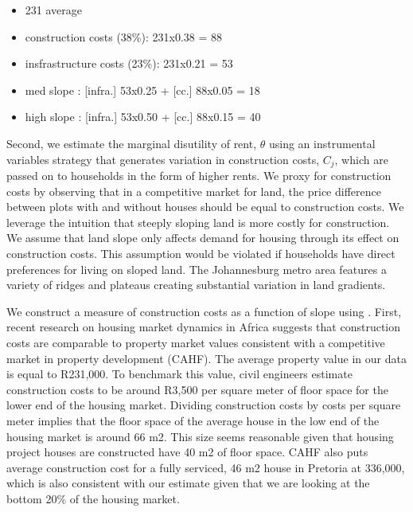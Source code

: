 \documentclass[12pt]{article}
\begin{document}


\begin{itemize}
	\item 231 average
	\item construction costs (38\%): 231x0.38 = 88
	\item insfrastructure costs (23\%): 231x0.21 = 53
	\item med slope  : [infra.] 53x0.25 + [cc.] 88x0.05 = 18
	\item high slope : [infra.] 53x0.50 + [cc.] 88x0.15 = 40


\end{itemize}


Second, we estimate the marginal disutility of rent, $\theta$ using an instrumental variables strategy that generates variation in construction costs, $C_j$, which are passed on to households in the form of higher rents.  We proxy for construction costs by observing that in a competitive market for land, the price difference between plots with and without houses should be equal to construction costs.  We leverage the intuition that steeply sloping land is more costly for construction.  We assume that land slope only affects demand for housing through its effect on construction costs.  This assumption would be violated if households have direct preferences for living on sloped land.   The Johannesburg metro area features a variety of ridges and plateaus creating substantial variation in land gradients.


We construct a measure of construction costs as a function of slope using .  First, recent research on housing market dynamics in Africa suggests that construction costs are comparable to property market values consistent with a competitive market in property development (CAHF).  The average property value in our data is equal to R231,000.  To benchmark this value, civil engineers estimate construction costs to be around R3,500 per square meter of floor space for the lower end of the housing market.  Dividing construction costs by costs per square meter implies that the floor space of the average house in the low end of the housing market is around 66 m2.  This size seems reasonable given that housing project houses are constructed have 40 m2 of floor space.  CAHF also puts average construction cost for a fully serviced, 46 m2 house in Pretoria at 336,000, which is also consistent with our estimate given that we are looking at the bottom 20\% of the housing market.
\end{document}
